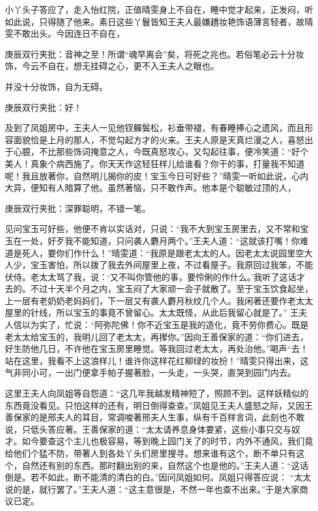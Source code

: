 \begin{parag}
    小丫头子答应了，走入怡红院，正值晴雯身上不自在，睡中觉才起来，正发闷，听如此说，只得随了他来。素日这些丫鬟皆知王夫人最嫌趫妆艳饰语薄言轻者，故晴雯不敢出头。今因连日不自在，\begin{note}庚辰双行夹批：音神之至！所谓“魂早离会”矣，将死之兆也。若俗笔必云十分妆饰，今云不自在，想无挂碍之心，更不入王夫人之眼也。\end{note}并没十分妆饰，自为无碍。\begin{note}庚辰双行夹批：好！\end{note}及到了凤姐房中，王夫人一见他钗軃鬓松，衫垂带褪，有春睡捧心之遗风，而且形容面貌恰是上月的那人，不觉勾起方才的火来。王夫人原是天真烂漫之人，喜怒出于心臆，不比那些饰词掩意之人，今既真怒攻心，又勾起往事，便冷笑道：“好个美人！真象个病西施了。你天天作这轻狂样儿给谁看？你干的事，打量我不知道呢！我且放著你，自然明儿揭你的皮！宝玉今日可好些？”晴雯一听如此说，心内大异，便知有人暗算了他。虽然著恼，只不敢作声。他本是个聪敏过顶的人，\begin{note}庚辰双行夹批：深罪聪明，不错一笔。\end{note}见问宝玉可好些，他便不肯以实话对，只说：“我不大到宝玉房里去，又不常和宝玉在一处，好歹我不能知道，只问袭人麝月两个。”王夫人道：“这就该打嘴！你难道是死人，要你们作什么！”晴雯道：“我原是跟老太太的人。因老太太说园里空大人少，宝玉害怕，所以拨了我去外间屋里上夜，不过看屋子。我原回过我笨，不能伏侍。老太太骂了我，说：‘又不叫你管他的事，要伶俐的作什么。’我听了这话才去的。不过十天半个月之内，宝玉闷了大家顽一会子就散了。至于宝玉饮食起坐，上一层有老奶奶老妈妈们，下一层又有袭人麝月秋纹几个人。我闲著还要作老太太屋里的针线，所以宝玉的事竟不曾留心。太太既怪，从此后我留心就是了。” 王夫人信以为实了，忙说：“阿弥陀佛！你不近宝玉是我的造化，竟不劳你费心。既是老太太给宝玉的，我明儿回了老太太，再撵你。”因向王善保家的道：“你们进去，好生防他几日，不许他在宝玉房里睡觉。等我回过老太太，再处治他。”喝声“去！站在这里，我看不上这浪样儿！谁许你这样花红柳绿的妆扮！”晴雯只得出来，这气非同小可，一出门便拿手帕子握著脸，一头走，一头哭，直哭到园门内去。
\end{parag}


\begin{parag}
    这里王夫人向凤姐等自怨道：“这几年我越发精神短了，照顾不到。这样妖精似的东西竟没看见。只怕这样的还有，明日倒得查查。”凤姐见王夫人盛怒之际，又因王善保家的是邢夫人的耳目，常调唆著邢夫人生事，纵有千百样言词，此刻也不敢说，只低头答应著。王善保家的道：“太太请养息身体要紧，这些小事只交与奴才。如今要查这个主儿也极容易，等到晚上园门关了的时节，内外不通风，我们竟给他们个猛不防，带著人到各处丫头们房里搜寻。想来谁有这个，断不单只有这个，自然还有别的东西。那时翻出别的来，自然这个也是他的。”王夫人道：“这话倒是。若不如此，断不能清的清白的白。”因问凤姐如何。凤姐只得答应说： “太太说的是，就行罢了。”王夫人道：“这主意很是，不然一年也查不出来。”于是大家商议已定。
\end{parag}


